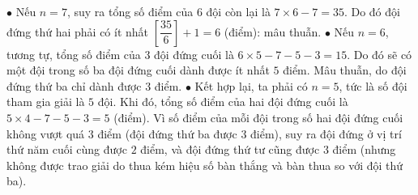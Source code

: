 \begin{multicols}{2}
	\vskip 0.1cm
	$\bullet$ Nếu $n=7$, suy ra tổng số điểm của $6$ đội còn lại là $7\times 6-7=35$. Do đó đội đứng thứ hai phải có ít nhất $[\dfrac{35}{6}]+1=6$ (điểm): mâu thuẫn.
	\vskip 0.1cm
	$\bullet$ Nếu $n=6$, tương tự, tổng số điểm của $3$ đội đứng cuối là $6\times 5-7-5-3=15$. Do đó sẽ có một đội trong số ba đội đứng cuối dành được ít nhất $5$ điểm. Mâu thuẫn, do đội đứng thứ ba chỉ dành được $3$ điểm.
	\vskip 0.1cm
	$\bullet$ Kết hợp lại, ta phải có $n=5$, tức là số đội tham gia giải là $5$ đội.
	\vskip 0.1cm
	Khi đó, tổng số điểm của hai đội đứng cuối là $5\times 4-7-5-3=5$ (điểm).
	\vskip 0.1cm
	Vì số điểm của mỗi đội trong số  hai đội đứng cuối không vượt quá $3$ điểm (đội đứng thứ ba được $3$ điểm), suy ra đội đứng ở vị trí thứ năm cuối cùng được $2$ điểm, và đội đứng thứ tư cũng được $3$ điểm (nhưng không được trao giải do thua kém hiệu số bàn thắng và bàn thua so với đội thứ ba). 
\end{multicols}
\newpage
\begingroup
\thispagestyle{toancuabinone}
